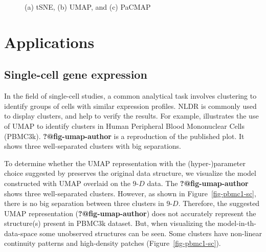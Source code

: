 \documentclass[
  12pt]{article}
\begin{document}
\begin{figure}[H]


\caption{\label{fig-five-gau-projs}(a) tSNE, (b) UMAP, and (c) PaCMAP}

\end{figure}%

\section{Applications}\label{sec-applications}

\subsection{Single-cell gene
expression}\label{single-cell-gene-expression}

In the field of single-cell studies, a common analytical task involves
clustering to identify groups of cells with similar expression profiles.
NLDR is commonly used to display clusters, and help to verify the
results. For example, \citet{chen2023} illustrates the use of UMAP to
identify clusters in Human Peripheral Blood Mononuclear Cells (PBMC3k).
\textbf{?@fig-umap-author} is a reproduction of the published plot. It
shows three well-separated clusters with big separations.

To determine whether the UMAP representation with the (hyper-)parameter
choice suggested by \citet{chen2023} preserves the original data
structure, we visualize the model constructed with UMAP overlaid on the
\(9\text{-}D\) data. The \textbf{?@fig-umap-author} shows three
well-separated clusters. However, as shown in Figure~\ref{fig-pbmc1-sc},
there is no big separation between three clusters in \(9\text{-}D\).
Therefore, the suggested UMAP representation
(\textbf{?@fig-umap-author}) does not accurately represent the
structure(s) present in PBMC3k dataset. But, when visualizing the
model-in-th-data-space some unobserved structures can be seen. Some
clusters have non-linear continuity patterns and high-density patches
(Figure~\ref{fig-pbmc1-sc}).
\end{document}
